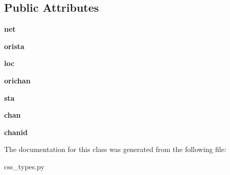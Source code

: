 \subsection*{Public Attributes}
\begin{DoxyCompactItemize}
\item 
\hypertarget{classcss__types_1_1chanlut_afec6a0efa7f16df85e1ac81c29eb4d1f}{}{\bfseries net}\label{classcss__types_1_1chanlut_afec6a0efa7f16df85e1ac81c29eb4d1f}

\item 
\hypertarget{classcss__types_1_1chanlut_aa68c0fb9d2e4913db898911db1e5dd00}{}{\bfseries orista}\label{classcss__types_1_1chanlut_aa68c0fb9d2e4913db898911db1e5dd00}

\item 
\hypertarget{classcss__types_1_1chanlut_afa26a329cf66c9bc2691e389113bb8c8}{}{\bfseries loc}\label{classcss__types_1_1chanlut_afa26a329cf66c9bc2691e389113bb8c8}

\item 
\hypertarget{classcss__types_1_1chanlut_ad970a355c02b46acea6574e6bddc1995}{}{\bfseries orichan}\label{classcss__types_1_1chanlut_ad970a355c02b46acea6574e6bddc1995}

\item 
\hypertarget{classcss__types_1_1chanlut_abcacd29b7e9b4e376b0ba23e62de0e6a}{}{\bfseries sta}\label{classcss__types_1_1chanlut_abcacd29b7e9b4e376b0ba23e62de0e6a}

\item 
\hypertarget{classcss__types_1_1chanlut_a890e8efbff0878822ed0adaef786fa05}{}{\bfseries chan}\label{classcss__types_1_1chanlut_a890e8efbff0878822ed0adaef786fa05}

\item 
\hypertarget{classcss__types_1_1chanlut_a44495a3c6b92ac54c8e2f4937f30c933}{}{\bfseries chanid}\label{classcss__types_1_1chanlut_a44495a3c6b92ac54c8e2f4937f30c933}

\end{DoxyCompactItemize}


The documentation for this class was generated from the following file\+:\begin{DoxyCompactItemize}
\item 
css\+\_\+types.\+py\end{DoxyCompactItemize}
